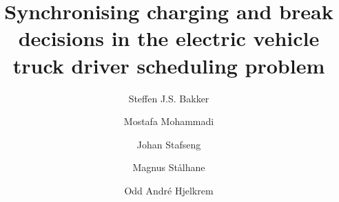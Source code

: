 \documentclass[3p,11pt,authoryear]{elsarticle}  %
\begin{document}

\begin{frontmatter}


\title{{Synchronising charging and break decisions in the electric vehicle truck driver scheduling problem}}

\author[indokaddress]{Steffen J.S. Bakker} 
            \author[indokaddress]{Mostafa Mohammadi}
            \author[indokaddress]{Johan Stafseng}
            \author[indokaddress]{Magnus Stålhane}
            \author[sintefaddress]{Odd André Hjelkrem}

		\address[indokaddress]{Department of Industrial Economics and Technology Management, Norwegian University of Science and Technology, Alfred Getz veg 3, NO-7491 Trondheim, Norway}
        \address[sintefaddress]{Department of Energy Systems, SINTEF Energy Research - Trondheim, Norway}



\end{frontmatter}
\end{document}
